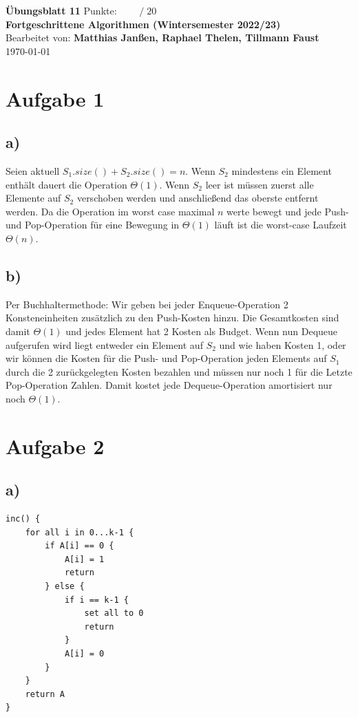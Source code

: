 \documentclass[a4paper]{scrartcl}
\def\sheetNumber{11}
\def\names{Matthias Janßen, Raphael Thelen, Tillmann
Faust}
\def\sumPoints{20}
\begin{document}
 

\begin{doublespace} %
\noindent \textbf{\LARGE{Übungsblatt \sheetNumber}}
\hfill  {\large Punkte: $\boxed{\qquad  /\; \sumPoints}$}\\
{\Large \textbf{Fortgeschrittene Algorithmen (Wintersemester 2022/23)}\\
Bearbeitet von: \textbf{\names}\\
\today}
\end{doublespace}


\section*{Aufgabe 1}
\subsection*{a)}
Seien aktuell \texttt{$S_1.size()+S_2.size()=n$}. Wenn $S_2$ mindestens ein Element enthält dauert die Operation $\Theta(1)$. Wenn $S_2$ leer ist müssen zuerst alle Elemente auf $S_2$ verschoben werden und anschließend das oberste entfernt werden. Da die Operation im worst case maximal $n$ werte bewegt und jede Push- und Pop-Operation für eine Bewegung in $\Theta(1)$ läuft ist die worst-case Laufzeit $\Theta(n)$.

\subsection*{b)}
Per Buchhaltermethode: Wir geben bei jeder Enqueue-Operation 2 Konsteneinheiten zusätzlich zu den Push-Kosten hinzu. Die Gesamtkosten sind damit $\Theta(1)$ und jedes Element hat 2 Kosten als Budget. Wenn nun Dequeue aufgerufen wird liegt entweder ein Element auf $S_2$ und wie haben Kosten 1, oder wir können die Kosten für die Push- und Pop-Operation jeden Elements auf $S_1$ durch die 2 zurückgelegten Kosten bezahlen und müssen nur noch 1 für die Letzte Pop-Operation Zahlen. Damit kostet jede Dequeue-Operation amortisiert nur noch $\Theta(1)$.

\section*{Aufgabe 2}
\subsection*{a)}
\begin{verbatim}
inc() {
	for all i in 0...k-1 {
		if A[i] == 0 {
			A[i] = 1
			return
		} else {
			if i == k-1 {
				set all to 0
				return
			}
			A[i] = 0
		}
	}
	return A
}
\end{verbatim}
\end{document}
